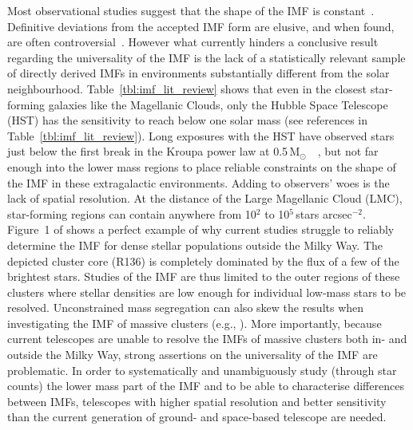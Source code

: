\documentclass[referee]{aa}
\newcommand{\msun}{M$_\odot$~}
\newcommand{\h}[1]{$^{#1}$}
\newcommand{\spae}{stars arcsec$^{-2}$}
\begin{document}
Most observational studies suggest that the shape of the IMF is constant~\citep{Lada2003-ip,Kroupa2002,Bastian2010}.
Definitive deviations from the accepted IMF form are elusive, and when found, are often controversial~\citep{Van_Dokkum2010-gx,Conroy2012-hv,Drass2016-kp}.
However what currently hinders a conclusive result regarding the universality of the IMF is the lack of a statistically relevant sample of directly derived IMFs in environments substantially different from the solar neighbourhood.
Table~\ref{tbl:imf_lit_review} shows that even in the closest star-forming galaxies like the Magellanic Clouds, only the Hubble Space Telescope (HST) has the sensitivity to reach below one solar mass (see references in Table~\ref{tbl:imf_lit_review}).
Long exposures with the HST have observed stars just below the first break in the Kroupa power law at 0.5\,\msun~\citep{dario2009,kalirai2013,geha2013}, but not far enough into the lower mass regions to place reliable constraints on the shape of the IMF in these extragalactic environments.
Adding to observers' woes is the lack of spatial resolution.
At the distance of the Large Magellanic Cloud (LMC), star-forming regions can contain anywhere from 10\h2 to 10\h5\,\spae.
Figure~1 of \citet{sirianni2000} shows a perfect example of why current studies struggle to reliably determine the IMF for dense stellar populations outside the Milky Way.
The depicted cluster core (R136) is completely dominated by the flux of a few of the brightest stars.
Studies of the IMF are thus limited to the outer regions of these clusters where stellar densities are low enough for individual low-mass stars to be resolved.
Unconstrained mass segregation can also skew the results when investigating the IMF of massive clusters (e.g., \citealt{Ascenso2009-de}).
More importantly, because current telescopes are unable to resolve the IMFs of massive clusters both in- and outside the Milky Way, strong assertions on the universality of the IMF are problematic.
In order to systematically and unambiguously study (through star counts) the lower mass part of the IMF and to be able to characterise differences between IMFs, telescopes with higher spatial resolution and better sensitivity than the current generation of ground- and space-based telescope are needed.
\end{document}
